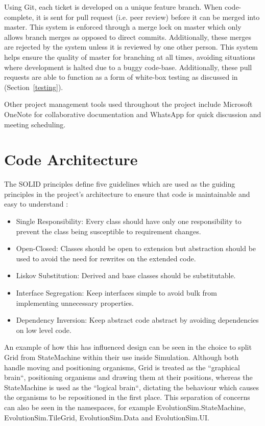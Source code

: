 \documentclass[a4paper, oneside, 11pt]{report}
\begin{document}
Using Git, each ticket is developed on a unique feature branch. When code-complete, it is sent for pull request (i.e. peer review) before it can be merged into master. This system is enforced through a merge lock on master which only allows branch merges as opposed to direct commits. Additionally, these merges are rejected by the system unless it is reviewed by one other person. This system helps ensure the quality of master for branching at all times, avoiding situations where development is halted due to a buggy code-base. Additionally, these pull requests are able to function as a form of white-box testing as discussed in (Section~\ref{testing}).

Other project management tools used throughout the project include Microsoft OneNote for collaborative documentation and WhatsApp for quick discussion and meeting scheduling.

\section{Code Architecture}\label{architecture}
The SOLID principles define five guidelines which are used as the guiding principles in the project's architecture to ensure that code is maintainable and easy to understand \cite{kelmendi}:
\begin{itemize}
	\item Single Responsibility: Every class should have only one responsibility to prevent the class being susceptible to requirement changes.
	\item Open-Closed: Classes should be open to extension but abstraction should be used to avoid the need for rewrites on the extended code.
	\item Liskov Substitution: Derived and base classes should be substitutable.
	\item Interface Segregation: Keep interfaces simple to avoid bulk from implementing unnecessary properties.
	\item Dependency Inversion: Keep abstract code abstract by avoiding dependencies on low level code.
\end{itemize}

An example of how this has influenced design can be seen in the choice to split Grid from StateMachine within their use inside Simulation. Although both handle moving and positioning organisms, Grid is treated as the ``graphical brain``, positioning organisms and drawing them at their positions, whereas the StateMachine is used as the ``logical brain``, dictating the behaviour which causes the organisms to be repositioned in the first place. This separation of concerns can also be seen in the namespaces, for example EvolutionSim.StateMachine, EvolutionSim.TileGrid, EvolutionSim.Data and EvolutionSim.UI.
\end{document}
